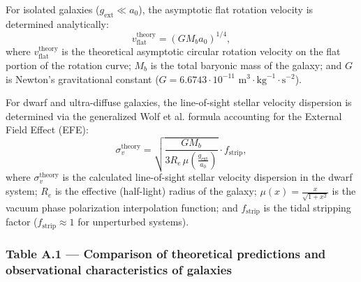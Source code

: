 \documentclass[11pt,a4paper]{article}
\theoremstyle{definition}
\begin{document}
For isolated galaxies ($g_{\text{ext}} \ll a_0$), the asymptotic flat rotation velocity is determined analytically:
\begin{equation}\label{eq:A.2}\tag{A.2}
v_{\text{flat}}^{\text{theory}} = \left( G M_b a_0 \right)^{1/4},
\end{equation}
where $v_{\text{flat}}^{\text{theory}}$ is the theoretical asymptotic circular rotation velocity on the flat portion of the rotation curve; $M_b$ is the total baryonic mass of the galaxy; and $G$ is Newton's gravitational constant ($G = 6.6743 \cdot 10^{-11}\text{ m}^3\cdot\text{kg}^{-1}\cdot\text{s}^{-2}$).

For dwarf and ultra-diffuse galaxies, the line-of-sight stellar velocity dispersion is determined via the generalized Wolf et al. formula \cite{ref29} accounting for the External Field Effect (EFE):
\begin{equation}\label{eq:A.3}\tag{A.3}
\sigma_v^{\text{theory}} = \sqrt{\frac{G M_b}{3 R_e \, \mu\left( \frac{g_{\text{ext}}}{a_0} \right)}} \cdot f_{\text{strip}},
\end{equation}
where $\sigma_v^{\text{theory}}$ is the calculated line-of-sight stellar velocity dispersion in the dwarf system; $R_e$ is the effective (half-light) radius of the galaxy; $\mu(x) = \frac{x}{\sqrt{1+x^2}}$ is the vacuum phase polarization interpolation function; and $f_{\text{strip}}$ is the tidal stripping factor ($f_{\text{strip}} \approx 1$ for unperturbed systems).

\subsubsection*{Table A.1 --- Comparison of theoretical predictions and observational characteristics of galaxies}
\end{document}
